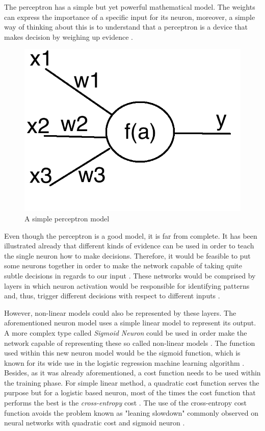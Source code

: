 \documentclass{article}
\begin{document}
The perceptron has a simple but yet powerful mathematical model. The weights can express the importance of a specific input for its neuron, moreover, a simple way of thinking about this is to understand that a perceptron is a device that makes decision by weighing up evidence \cite{nielsen2016}.
\begin{figure}[h!]
\centering
	\includegraphics[scale=0.2]{perceptron.png}
\caption{A simple perceptron model}
\label{fig:perceptron}
\end{figure}

Even though the perceptron is a good model, it is far from complete. It has been illustrated already that different kinds of evidence can be used in order to teach the single neuron how to make decisions. Therefore, it would be feasible to put some neurons together in order to make the network capable of taking quite subtle decisions in regards to our input \cite{goodfellow2016_book}. These networks would be comprised by layers in which neuron activation would be responsible for identifying patterns and, thus, trigger different decisions with respect to different inputs \cite{nielsen2016}. 

However, non-linear models could also be represented by these layers. The aforementioned neuron model uses a simple linear model to represent its output. A more complex type called \textit{Sigmoid Neuron} could be used in order make the network capable of representing these so called non-linear models \cite{goodfellow2016_book}. The function used within this new neuron model would be the sigmoid function, which is known for its wide use in the logistic regression machine learning algorithm \cite{nielsen2016}. Besides, as it was already aforementioned, a cost function needs to be used within the training phase. For simple linear method, a quadratic cost function serves the purpose but for a logistic based neuron, most of the times the cost function that performs the best is the \textit{cross-entropy} cost \cite{nielsen2016}. The use of the cross-entropy cost function avoids the problem known as "leaning slowdown" commonly observed on neural networks with quadratic cost and sigmoid neuron \cite{nielsen2016}.
\end{document}
